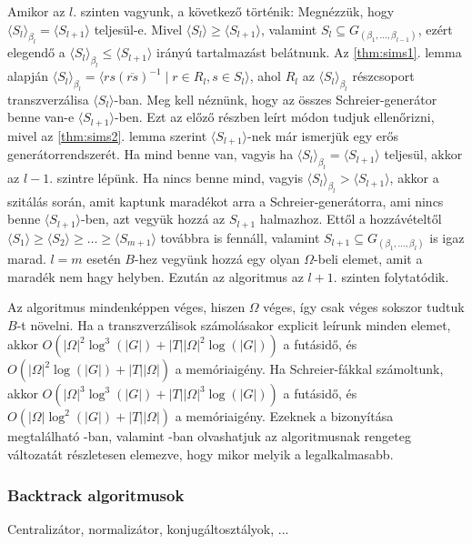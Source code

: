 Amikor az $l$. szinten vagyunk, a következő történik:
Megnézzük, hogy $\langle S_l \rangle_{\beta_l} = \langle S_{l+1} \rangle$ teljesül-e.
Mivel $\langle S_l \rangle \ge \langle S_{l+1} \rangle$, valamint $S_l \subseteq G_{(\beta_1, \dots, \beta_{l-1})}$, ezért elegendő a $\langle S_l \rangle_{\beta_l} \le \langle S_{l+1} \rangle$ irányú tartalmazást belátnunk.
Az \ref{thm:sims1}. lemma alapján $\langle S_l \rangle_{\beta_l} = \langle rs(\overline{rs})^{-1} \mid r\in R_l, s\in S_l \rangle$, ahol $R_l$ az $\langle S_l \rangle_{\beta_l}$ részcsoport transzverzálisa $\langle S_l \rangle$-ban.
Meg kell néznünk, hogy az összes Schreier-generátor benne van-e $\langle S_{l+1} \rangle$-ben.
Ezt az előző részben leírt módon tudjuk ellenőrizni, mivel az \ref{thm:sims2}. lemma szerint $\langle S_{l+1} \rangle$-nek már ismerjük egy erős generátorrendszerét.
Ha mind benne van, vagyis ha $\langle S_l \rangle_{\beta_l} = \langle S_{l+1} \rangle$ teljesül, akkor az $l-1$. szintre lépünk.
Ha nincs benne mind, vagyis $\langle S_l \rangle_{\beta_l} > \langle S_{l+1} \rangle$, akkor a szitálás során, amit kaptunk maradékot arra a Schreier-generátorra, ami nincs benne $\langle S_{l+1} \rangle$-ben,
azt vegyük hozzá az $S_{l+1}$ halmazhoz.
Ettől a hozzávételtől $\langle S_1 \rangle \ge \langle S_2 \rangle \ge \dots \ge \langle S_{m+1} \rangle$ továbbra is fennáll, valamint $S_{l+1} \subseteq G_{(\beta_1, \dots, \beta_{l})}$ is igaz marad.
$l = m$ esetén $B$-hez vegyünk hozzá egy olyan $\Omega$-beli elemet, amit a maradék nem hagy helyben.
Ezután az algoritmus az $l+1$. szinten folytatódik.

Az algoritmus mindenképpen véges, hiszen $\Omega$ véges, így csak véges sokszor tudtuk $B$-t növelni.
Ha a transzverzálisok számolásakor explicit leírunk minden elemet, akkor $O(|\Omega|^2 \log^3(|G|) + |T||\Omega|^2 \log(|G|))$ a futásidő, és $O(|\Omega|^2 \log(|G|) + |T||\Omega|)$ a memóriaigény.
Ha Schreier-fákkal számoltunk, akkor $O(|\Omega|^3 \log^3(|G|) + |T||\Omega|^3 \log(|G|))$ a futásidő, és $O(|\Omega| \log^2(|G|) + |T||\Omega|)$ a memóriaigény.
Ezeknek a bizonyítása megtalálható \cite{Ser03}-ban, valamint \cite{Mur03}-ban olvashatjuk az algoritmusnak rengeteg változatát részletesen elemezve, hogy mikor melyik a legalkalmasabb.


\subsubsection{Backtrack algoritmusok}
\label{subsubsec:permbt}
Centralizátor, normalizátor, konjugáltosztályok, ...
